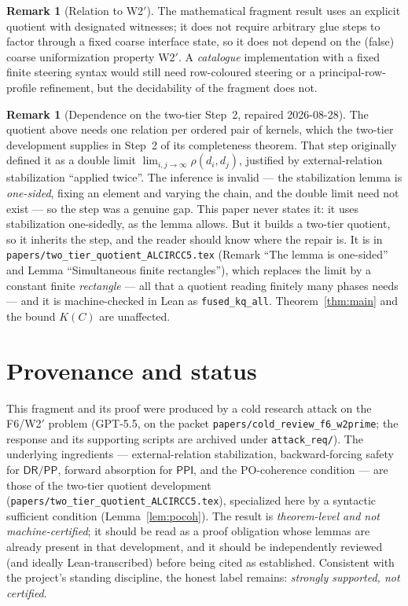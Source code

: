 \documentclass[11pt]{article}
\newcommand{\DR}{\mathsf{DR}}
\newcommand{\PP}{\mathsf{PP}}
\newcommand{\PPI}{\mathsf{PPI}}
\newcommand{\code}[1]{\texttt{#1}}
\theoremstyle{plain}
\theoremstyle{definition}
\newtheorem{remark}[theorem]{Remark}
\begin{document}
\begin{remark}[Relation to W2$'$]
The mathematical fragment result uses an explicit quotient with
designated witnesses; it does not require arbitrary glue steps to factor
through a fixed coarse interface state, so it does not depend on the
(false) coarse uniformization property W2$'$. A \emph{catalogue}
implementation with a fixed finite steering syntax would still need
row-coloured steering or a principal-row-profile refinement, but the
decidability of the fragment does not.
\end{remark}

\begin{remark}[Dependence on the two-tier Step~2, repaired 2026-08-28]
\label{rem:step2dep}
The quotient above needs one relation per ordered pair of kernels, which the
two-tier development supplies in Step~2 of its completeness theorem. That step
originally defined it as a double limit $\lim_{i,j\to\infty}\rho(d_i,d_j)$,
justified by external-relation stabilization ``applied twice''. The inference is
invalid --- the stabilization lemma is \emph{one-sided}, fixing an element and
varying the chain, and the double limit need not exist --- so the step was a
genuine gap. This paper never states it: it uses stabilization one-sidedly, as
the lemma allows. But it builds a two-tier quotient, so it inherits the step,
and the reader should know where the repair is. It is in
\code{papers/two\_tier\_quotient\_ALCIRCC5.tex} (Remark ``The lemma is
one-sided'' and Lemma ``Simultaneous finite rectangles''), which replaces the
limit by a constant finite \emph{rectangle} --- all that a quotient reading
finitely many phases needs --- and it is machine-checked in Lean as
\code{fused\_kq\_all}. Theorem~\ref{thm:main} and the bound $K(C)$ are
unaffected.
\end{remark}

\section{Provenance and status}

This fragment and its proof were produced by a cold research attack on
the F6/W2$'$ problem (GPT-5.5, on the packet
\code{papers/cold\_review\_f6\_w2prime}; the response and its supporting
scripts are archived under \code{attack\_req/}). The underlying
ingredients --- external-relation stabilization, backward-forcing safety
for $\DR/\PP$, forward absorption for $\PPI$, and the PO-coherence
condition --- are those of the two-tier quotient development
(\code{papers/two\_tier\_quotient\_ALCIRCC5.tex}), specialized here by a
syntactic sufficient condition (Lemma~\ref{lem:pocoh}). The result is
\emph{theorem-level and not machine-certified}; it should be read as a
proof obligation whose lemmas are already present in that development,
and it should be independently reviewed (and ideally Lean-transcribed)
before being cited as established. Consistent with the project's standing
discipline, the honest label remains: \emph{strongly supported, not
certified}.
\end{document}
